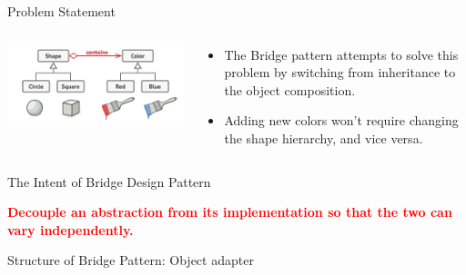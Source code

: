 \documentclass[13pt]{beamer}
\begin{document}
\begin{frame}{Problem Statement}
	\begin{columns}[T]
		\begin{column}{.5\textwidth}
			\includegraphics[scale=0.45]{./images/solution.png}
		\end{column}
	
		\begin{column}{.4\textwidth}
			\begin{itemize}
				\item The Bridge pattern attempts to solve this problem by switching from inheritance to the object composition.
				\item Adding new colors won’t require changing the shape hierarchy, and vice versa.
			\end{itemize}
		\end{column}
	\end{columns}
\end{frame}

\begin{frame}{The Intent of Bridge Design Pattern}
	\begin{center}
	\textcolor{red}{\textbf{Decouple an abstraction from its implementation so that the two can vary independently.}}
	\end{center}
\end{frame}

\begin{frame}{Structure of Bridge Pattern: Object adapter}
	\begin{center}
	\end{center}
\end{frame}
\end{document}
